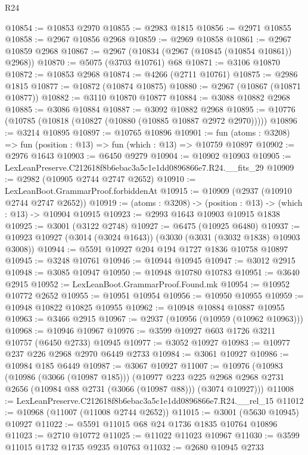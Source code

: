 \begin{lexlean}{R24}
\begin{coremodule}
@10854 := @10853 @2970
@10855 := @2983 @1815
@10856 := @2971 @10855
@10858 := @2967 @10856 @2968
@10859 := @2969 @10858
@10861 := @2967 @10859 @2968
@10867 := @2967 (@10834 (@2967 (@10845 (@10854 @10861)) @2968))
@10870 := @5075 (@3703 @10761) @68
@10871 := @3106 @10870
@10872 := @10853 @2968
@10874 := @4266 (@2711 @10761)
@10875 := @2986 @1815
@10877 := @10872 (@10874 @10875)
@10880 := @2967 (@10867 (@10871 @10877))
@10882 := @3110 @10870 @10877
@10884 := @3088 @10882 @2968
@10885 := @3086 @10884
@10887 := @3092 @10882 @2968
@10895 := @10776 (@10785 (@10818 (@10827 (@10880 (@10885 @10887 @2972 @2970)))))
@10896 := @3214 @10895
@10897 := @10765 @10896
@10901 := fun (atoms : @3208) => fun (position : @13) => fun (which : @13) => @10759 @10897
@10902 := @2976 @1643
@10903 := @6450 @9279
@10904 := @10902 @10903
@10905 := LexLeanPreserve.C212618f8b6ebac3a5c1e1dd0896866e7.R24.__fits_29
@10909 := @2982 (@10905 @2744 @2747 @2652)
@10910 := LexLeanBoot.GrammarProof.forbiddenAt
@10915 := @10909 (@2937 (@10910 @2744 @2747 @2652))
@10919 := (atoms : @3208) -> (position : @13) -> (which : @13) -> @10904 @10915
@10923 := @2993 @1643 @10903 @10915 @1838
@10925 := @3001 (@3122 @2748)
@10927 := @6475 (@10925 @6480)
@10937 := @10923 @10927 (@3014 (@3024 @1643)) (@3030 (@3031 (@3032 @1838) @10903 @3008))
@10944 := @5591 @10927 @204 @194 @1727 @1836 @10758 @10897
@10945 := @3248 @10761
@10946 := @10944 @10945
@10947 := @3012 @2915
@10948 := @3085 @10947
@10950 := @10948 @10780 @10783
@10951 := @3640 @2915
@10952 := LexLeanBoot.GrammarProof.Found.mk
@10954 := @10952 @10772 @2652
@10955 := @10951 @10954
@10956 := @10950 @10955
@10959 := @10948 @10822 @10825 @10955
@10962 := @10948 @10884 @10887 @10955
@10963 := @3466 @2915
@10967 := @2937 (@10956 (@10959 (@10962 @10963)))
@10968 := @10946 @10967
@10976 := @3599 @10927 @603 @1726 @3211 @10757 (@6450 @2733) @10945
@10977 := @3052 @10927
@10983 := @10977 @237 @226 @2968 @2970 @6449 @2733
@10984 := @3061 @10927
@10986 := @10984 @185 @6449
@10987 := @3067 @10927
@11007 := @10976
    (@10983
      (@10986 (@3066 (@10987 @185)))
      (@10977
        @223
        @225
        @2968
        @2968
        @2731
        @2656
        (@10984 @88 @2731 (@3066 (@10987 @88)))
        (@3074 @10927)))
@11008 := LexLeanPreserve.C212618f8b6ebac3a5c1e1dd0896866e7.R24.__rel_15
@11012 := @10968 (@11007 (@11008 @2744 @2652))
@11015 := @3001 (@5630 @10945) @10927
@11022 := @5591 @11015 @68 @24 @1736 @1835 @10764 @10896
@11023 := @2710 @10772
@11025 := @11022 @11023 @10967
@11030 := @3599 @11015 @1732 @1735 @9235 @10763
@11032 := @2680 @10945 @2733

\end{coremodule}
\end{lexlean}
